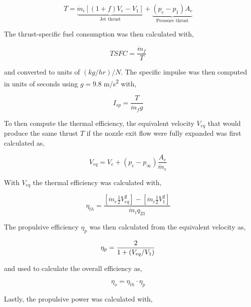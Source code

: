 \documentclass[conf]{new-aiaa} %
\begin{document}
\begin{equation}
    \label{eqn:Thrust}
    T=
    \underbrace{\dot{m}_i\left[\left(1+f\right)V_e-V_1\right]}_\text{Jet thrust}
    +
    \underbrace{\left(p_e-p_1\right)A_e}_\text{Pressure thrust}
\end{equation}

The thrust-specific fuel consumption was then calculated with,

\begin{equation}
    \label{eqn:TSFC}
    TSFC=\frac{\dot{m}_f}{T}
\end{equation}

and converted to units of $(kg/hr)/N$. The specific impulse was then computed in units of seconds using $g=9.8$ m/s\textsuperscript{2} with,

\begin{equation}
    \label{eqn:Isp}
    I_{sp}=\frac{T}{\dot{m}_f g}
\end{equation}

To then compute the thermal efficiency, the equivalent velocity $V_{eq}$ that would produce the same thrust $T$ if the nozzle exit flow were fully expanded was first calculated as,

\begin{equation}
    \label{eqn:Veq}
    V_{eq}=V_e+\left(p_e-p_\infty\right)\frac{A_e}{\dot{m}_e}
\end{equation}

With $V_{eq}$ the thermal efficiency was calculated with,

\begin{equation}
    \label{eqn:etath}
    \eta_{th}=\frac{\left[\dot{m}_e\frac{1}{2}V_{eq}^2\right]-\left[\dot{m}_i\frac{1}{2}V_{1}^2\right]}{\dot{m}_i q_{23}}
\end{equation}

The propulsive efficiency $\eta_{p}$ was then calculated from the equivalent velocity as,

\begin{equation}
    \label{eqn:etap}
    \left. \eta_p=\frac{2}{1+\left(V_{eq}\middle/V_1\right)} \right.
\end{equation}

and used to calculate the overall efficiency as,

\begin{equation}
    \label{eqn:etao}
    \eta_o=\eta_{th}\cdot\eta_p
\end{equation}

Lastly, the propulsive power was calculated with,
\end{document}
